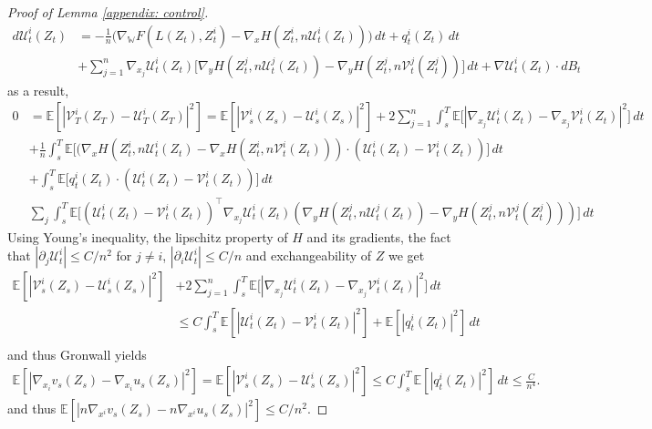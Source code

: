 \documentclass[11pt,reqno]{amsart}
\numberwithin{equation}{section}
\theoremstyle{definition}
\def\E{{\mathbb E}}
\newcommand{\wgrad}{\nabla_{\W}}
\newcommand{\W}{\mathbb W}
\begin{document}
\begin{proof}[Proof of Lemma \ref{appendix: control}]
\begin{align*}
    d\mathcal U_t^i(Z_t)&= -\frac 1n \Big(\wgrad F(L(Z_t),Z_t^i)-\nabla_x H(Z_t^i,n \mathcal U_t^i(Z_t))\Big)\,dt+q_t^i(Z_t)\,dt\\
    &+\sum_{j=1}^n \nabla_{x_j} \mathcal U_t^i(Z_t)\Big[\nabla_yH (Z_t^j,n\mathcal U_t^j(Z_t))-\nabla_y H(Z_t^j,n\mathcal V_t^j(Z_t^j))\Big]\,dt+\nabla \mathcal U_t^i(Z_t)\cdot dB_t
\end{align*}
as a result,
\begin{align*}
    0&=\E[|\mathcal V_T^i(Z_T)-\mathcal U_T^i(Z_T)|^2]=\E[|\mathcal V_s^i(Z_s)-\mathcal U_s^i(Z_s)|^2]+2\sum_{j=1}^n\int_s^T\E\big[|\nabla_{x_j} \mathcal U_t^i(Z_t)-\nabla_{x_j} \mathcal V_t^i(Z_t)|^2\big]\,dt\\
    &+\frac 1n\int_s^T\E\big[(\nabla_x H(Z_t^i,n\mathcal U_t^i(Z_t)-\nabla_x H(Z_t^i,n\mathcal V_t^i(Z_t)))\cdot (\mathcal U_t^i(Z_t)-\mathcal V_t^i(Z_t))\big]\,dt
    \\
    &+\int_s^T\E\big[q_t^i(Z_t)\cdot (\mathcal U_t^i(Z_t)-\mathcal V_t^i(Z_t))\big]\,dt\\
    &\sum_{j}\int_s^T \E\Big[(\mathcal U_t^i(Z_t)-\mathcal V_t^i(Z_t))^\top \nabla_{x_j} \mathcal U_t^i(Z_t)(\nabla_y H (Z_t^j,n\mathcal U_t^j(Z_t))-\nabla_y H(Z_t^j,n\mathcal V_t^j(Z_t^j)))\Big]\,dt
\end{align*}
Using Young's inequality, the lipschitz property of $H$ and its gradients, the fact that $|\partial_j \mathcal U_t^i| \leq C/n^2 $ for $j\neq i$, $|\partial_i \mathcal U_t^i| \leq C/n$ and exchangeability of $Z$ we get
\begin{align*}
    \E[|\mathcal V_s^i(Z_s)-\mathcal U_s^i(Z_s)|^2]&+2\sum_{j=1}^n\int_s^T\E\big[|\nabla_{x_j} \mathcal U_t^i(Z_t)-\nabla_{x_j} \mathcal V_t^i(Z_t)|^2\big]\,dt\\
    &\leq C \int_s^T \E[|\mathcal U_t^i(Z_t)-\mathcal V_t^i(Z_t)|^2]+\E[|q_t^i(Z_t)|^2]\,dt\\
\end{align*}
and thus Gronwall yields
\begin{align*}
    \E[|\nabla_{x_i} v_s(Z_s)-\nabla_{x_i} u_s(Z_s)|^2]=\E[|\mathcal V_s^i(Z_s)-\mathcal U_s^i(Z_s)|^2]\leq C \int_s^T \E[|q_t^i(Z_t)|^2]\,dt\leq \frac{C}{n^4}.
\end{align*}
and thus $\E[|n\nabla_{x^i} v_s(Z_s)-n\nabla_{x^i} u_s(Z_s)|^2]\leq C/n^2$.


\end{proof}
\end{document}
